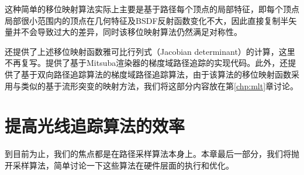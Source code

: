 这种简单的移位映射算法实际上主要是基于路径每个顶点的局部特征，即每个顶点局部很小范围内的顶点在几何特征及BSDF反射函数变化不大，因此直接复制半矢量并不会导致过大的差异，同时该移位映射算法仍然满足对称性。


\cite{a:GradientDomainPathTracing}还提供了上述移位映射函数雅可比行列式（Jacobian determinant）的计算，这里不再复写。\cite{a:GradientdomainpathtracingGPTandgradientdomainbidirectionalpathtracingGBDPTforMitsubarenderer}提供了基于Mitsuba渲染器的梯度域路径追踪的实现代码。此外，\cite{a:Gradient-DomainBidirectionalPathTracing}还提供了基于双向路径追踪算法的梯度域路径追踪算法，由于该算法的移位映射函数采用与\cite{a:ImprovedSamplingforGradientDomainMetropolisLightTransport}类似的基于流形突变的映射方法，我们将这部分内容放在第\ref{chp:mlt}章讨论。




	

\section{提高光线追踪算法的效率}\label{sec:pt-efficiency}
到目前为止，我们的焦点都是在路径采样算法本身上。本章最后一部分，我们将抛开采样算法，简单讨论一下这些算法在硬件层面的执行和优化。

